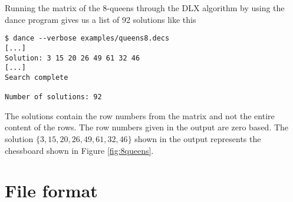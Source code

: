 \begin{example}
Running the matrix of the 8-queens through the DLX algorithm by using the dance program gives us a list of 92 solutions like this
\begin{verbatim}
$ dance --verbose examples/queens8.decs
[...]
Solution: 3 15 20 26 49 61 32 46
[...]
Search complete

Number of solutions: 92
\end{verbatim}
The solutions contain the row numbers from the matrix and not the entire content of the rows.
The row numbers given in the output are zero based.
The solution $\{3, 15, 20, 26, 49, 61, 32, 46\}$ shown in the output represents the chessboard shown in Figure \ref{fig:8queens}.



\end{example}












\section{File format}

